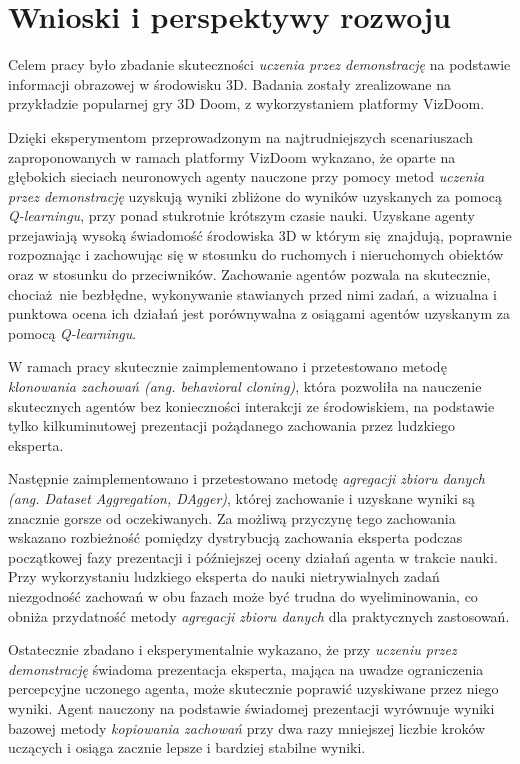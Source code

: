 \chapter{Wnioski i perspektywy rozwoju}

Celem pracy było zbadanie skuteczności \textit{uczenia przez demonstrację} na podstawie informacji obrazowej w środowisku 3D. Badania zostały zrealizowane na przykładzie popularnej gry 3D Doom, z wykorzystaniem platformy VizDoom.

Dzięki eksperymentom przeprowadzonym na najtrudniejszych scenariuszach zaproponowanych w ramach platformy VizDoom wykazano, że oparte na głębokich sieciach neuronowych agenty nauczone przy pomocy metod \textit{uczenia przez demonstrację} uzyskują wyniki zbliżone do wyników uzyskanych za pomocą \textit{Q-learningu}, przy ponad stukrotnie krótszym czasie nauki. Uzyskane agenty przejawiają wysoką świadomość środowiska 3D w którym się znajdują, poprawnie rozpoznając i zachowując się w stosunku do ruchomych i nieruchomych obiektów oraz w stosunku do przeciwników. Zachowanie agentów pozwala na skutecznie, chociaż nie bezbłędne, wykonywanie stawianych przed nimi zadań, a wizualna i punktowa ocena ich działań jest porównywalna z osiągami agentów uzyskanym za pomocą \textit{Q-learningu}.

W ramach pracy skutecznie zaimplementowano i przetestowano metodę \textit{klonowania zachowań (ang. behavioral cloning)}, która pozwoliła na nauczenie skutecznych agentów bez konieczności interakcji ze środowiskiem, na podstawie tylko kilkuminutowej prezentacji pożądanego zachowania przez ludzkiego eksperta.

Następnie zaimplementowano i przetestowano metodę \textit{agregacji zbioru danych (ang. Dataset Aggregation, DAgger)}, której zachowanie i uzyskane wyniki są znacznie gorsze od oczekiwanych. Za możliwą przyczynę tego zachowania wskazano rozbieżność pomiędzy dystrybucją zachowania eksperta podczas początkowej fazy prezentacji i późniejszej oceny działań agenta w trakcie nauki. Przy wykorzystaniu ludzkiego eksperta do nauki nietrywialnych zadań niezgodność zachowań w obu fazach może być trudna do wyeliminowania, co obniża przydatność metody \textit{agregacji zbioru danych} dla praktycznych zastosowań.

Ostatecznie zbadano i eksperymentalnie wykazano, że przy \textit{uczeniu przez demonstrację} świadoma prezentacja eksperta, mająca na uwadze ograniczenia percepcyjne uczonego agenta, może skutecznie poprawić uzyskiwane przez niego wyniki. Agent nauczony na podstawie świadomej prezentacji wyrównuje wyniki bazowej metody \textit{kopiowania zachowań} przy dwa razy mniejszej liczbie kroków uczących i osiąga zacznie lepsze i bardziej stabilne wyniki.

